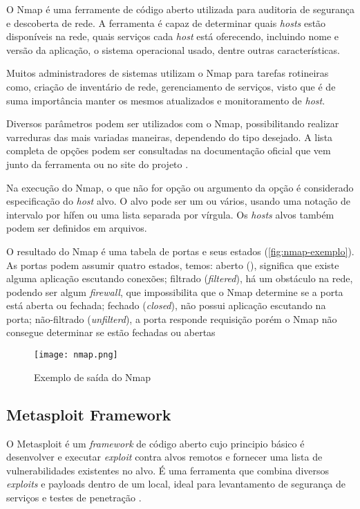  O Nmap é uma ferramente de código aberto utilizada para auditoria de segurança e descoberta de rede. A ferramenta é capaz de determinar quais \textit{hosts} estão disponíveis na rede, quais serviços cada \textit{host} está oferecendo, incluindo nome e versão da aplicação, o sistema operacional usado, dentre outras características.  

 Muitos administradores de sistemas utilizam o Nmap para tarefas rotineiras como, criação de inventário de rede, gerenciamento de serviços, visto que é de suma importância manter os mesmos atualizados e monitoramento de \textit{host}.

 Diversos parâmetros podem ser utilizados com o Nmap, possibilitando realizar varreduras das mais variadas maneiras, dependendo do tipo desejado. A lista completa de opções podem ser consultadas na documentação oficial que vem junto da ferramenta ou no site do projeto \cite{nmap}. 

 Na execução do Nmap, o que não for opção ou argumento da opção é considerado especificação do \textit{host} alvo. O alvo pode ser um ou vários, usando uma notação de intervalo por hífen ou uma lista separada por vírgula. Os \textit{hosts} alvos também podem ser definidos em arquivos.

 O resultado do Nmap é uma tabela de portas e seus estados (\autoref{fig:nmap-exemplo}). As portas podem assumir quatro estados, temos: aberto (), significa que existe alguma aplicação escutando conexões; filtrado (\textit{filtered}), há um obstáculo na rede, podendo ser algum \textit{firewall}, que impossibilita que o Nmap determine se a porta está aberta ou fechada; fechado (\textit{closed}), não possui aplicação escutando na porta; não-filtrado (\textit{unfilterd}), a porta responde requisição porém o Nmap não consegue determinar se estão fechadas ou abertas \cite{nmap}

 \begin{figure}[htb]
  \centering
  \caption{Exemplo de saída do Nmap}
  \texttt{[image: nmap.png]}
  \legend{}
  \label{fig:nmap-exemplo}
 \end{figure}

 \subsection{Metasploit Framework} \label{sec:metasploit}

 O Metasploit é um \textit{framework} de código aberto cujo principio básico é desenvolver e executar \textit{exploit} contra alvos remotos e fornecer uma lista de vulnerabilidades existentes no alvo. É uma ferramenta que combina diversos \textit{exploits} e payloads dentro de um local, ideal para levantamento de segurança de serviços e testes de penetração \cite{metasploit:yash}.  

